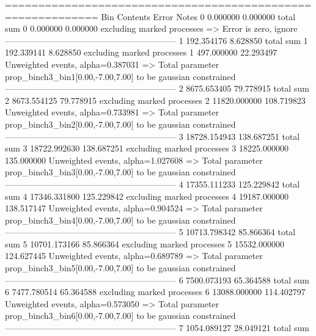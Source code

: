 ============================================================
Bin        Contents        Error           Notes                         
0          0.000000        0.000000        total sum                     
0          0.000000        0.000000        excluding marked processes    
  => Error is zero, ignore      
------------------------------------------------------------
1          192.354176      8.628850        total sum                     
1          192.339141      8.628850        excluding marked processes    
1          497.000000      22.293497       Unweighted events, alpha=0.387031
  => Total parameter prop_binch3_bin1[0.00,-7.00,7.00] to be gaussian constrained
------------------------------------------------------------
2          8675.653405     79.778915       total sum                     
2          8673.554125     79.778915       excluding marked processes    
2          11820.000000    108.719823      Unweighted events, alpha=0.733981
  => Total parameter prop_binch3_bin2[0.00,-7.00,7.00] to be gaussian constrained
------------------------------------------------------------
3          18728.154943    138.687251      total sum                     
3          18722.992630    138.687251      excluding marked processes    
3          18225.000000    135.000000      Unweighted events, alpha=1.027608
  => Total parameter prop_binch3_bin3[0.00,-7.00,7.00] to be gaussian constrained
------------------------------------------------------------
4          17355.111233    125.229842      total sum                     
4          17346.331800    125.229842      excluding marked processes    
4          19187.000000    138.517147      Unweighted events, alpha=0.904524
  => Total parameter prop_binch3_bin4[0.00,-7.00,7.00] to be gaussian constrained
------------------------------------------------------------
5          10713.798342    85.866364       total sum                     
5          10701.173166    85.866364       excluding marked processes    
5          15532.000000    124.627445      Unweighted events, alpha=0.689789
  => Total parameter prop_binch3_bin5[0.00,-7.00,7.00] to be gaussian constrained
------------------------------------------------------------
6          7500.073193     65.364588       total sum                     
6          7477.780514     65.364588       excluding marked processes    
6          13088.000000    114.402797      Unweighted events, alpha=0.573050
  => Total parameter prop_binch3_bin6[0.00,-7.00,7.00] to be gaussian constrained
------------------------------------------------------------
7          1054.089127     28.049121       total sum                     
